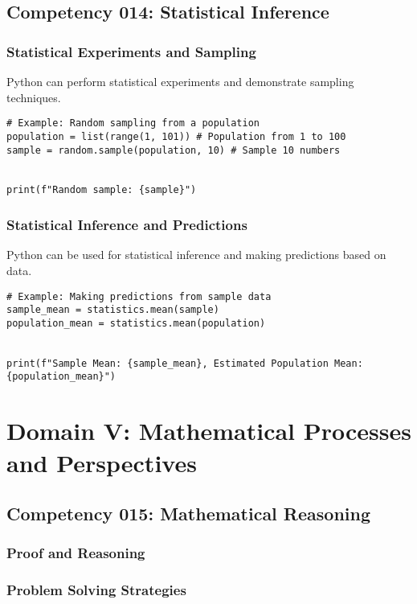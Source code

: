 \documentclass{book}
\begin{document}
\section{Competency 014: Statistical Inference}
\subsection{Statistical Experiments and Sampling}
Python can perform statistical experiments and demonstrate sampling techniques.


\begin{lstlisting}[style=pythonstyle]
# Example: Random sampling from a population
population = list(range(1, 101)) # Population from 1 to 100
sample = random.sample(population, 10) # Sample 10 numbers


print(f"Random sample: {sample}")
\end{lstlisting}


\subsection{Statistical Inference and Predictions}
Python can be used for statistical inference and making predictions based on data.


\begin{lstlisting}[style=pythonstyle]
# Example: Making predictions from sample data
sample_mean = statistics.mean(sample)
population_mean = statistics.mean(population)


print(f"Sample Mean: {sample_mean}, Estimated Population Mean: {population_mean}")
\end{lstlisting}


\chapter{Domain V: Mathematical Processes and Perspectives}

\section{Competency 015: Mathematical Reasoning}
\subsection{Proof and Reasoning}
\subsection{Problem Solving Strategies}
\end{document}
